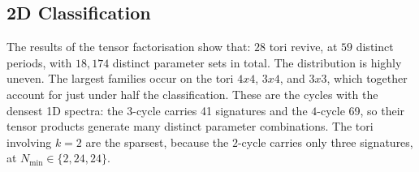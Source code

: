 \documentclass[aps,pra,reprint,amsmath,amssymb,superscriptaddress,floatfix]{revtex4-2}
\def\times{x}%
\begin{document}
\subsection{2D Classification}
The results of the tensor factorisation show that:
$28$ tori revive, at $59$ distinct
periods, with $18{,}174$ distinct parameter sets in total.
The distribution is highly uneven. The largest families
occur on the tori $4 \times 4$, $3 \times 4$, and
$3 \times 3$, which together account for just under half the
classification. These are the cycles with the densest 1D
spectra: the $3$-cycle carries 41 signatures and the
$4$-cycle 69, so their tensor products
generate many distinct parameter combinations. The tori
involving $k = 2$ are the sparsest, because the $2$-cycle
carries only three signatures, at $N_{\min} \in \{2, 24, 24\}$.
\end{document}
